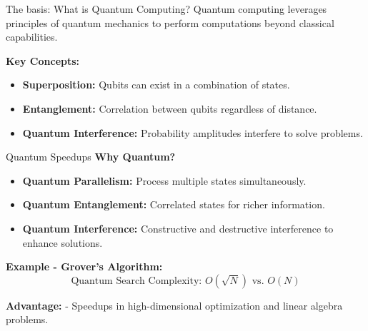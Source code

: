 \documentclass{beamer}
\begin{document}
\begin{frame}{The basis: What is Quantum Computing?}
Quantum computing leverages principles of quantum mechanics to perform computations beyond classical capabilities.

\vspace{10pt}
\textbf{Key Concepts:}
\begin{itemize}
\item \textbf{Superposition:} Qubits can exist in a combination of states.
\item \textbf{Entanglement:} Correlation between qubits regardless of distance.
\item \textbf{Quantum Interference:} Probability amplitudes interfere to solve problems.
\end{itemize}

\end{frame}



\begin{frame}{Quantum Speedups}
\textbf{Why Quantum?}
\begin{itemize}
    \item \textbf{Quantum Parallelism:} Process multiple states simultaneously.
    \item \textbf{Quantum Entanglement:} Correlated states for richer information.
    \item \textbf{Quantum Interference:} Constructive and destructive interference to enhance solutions.
\end{itemize}

\textbf{Example - Grover's Algorithm:}
\[
\text{Quantum Search Complexity: } O(\sqrt{N}) \text{ vs. } O(N)
\]

\textbf{Advantage:}
- Speedups in high-dimensional optimization and linear algebra problems.
\end{frame}
\end{document}
